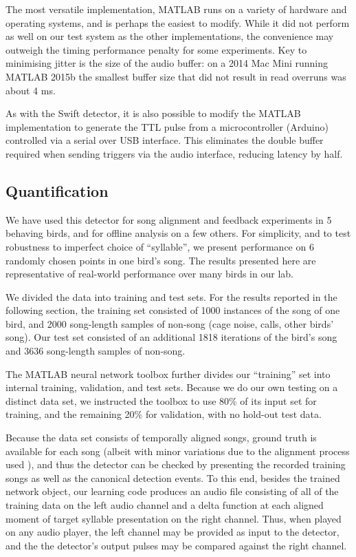 \documentclass[10pt,letterpaper]{article}
\begin{document}
The most versatile implementation, MATLAB runs on a variety of
hardware and operating systems, and is perhaps the easiest to modify.
While it did not perform as well on our test system as the other
implementations, the convenience may outweigh the timing
performance penalty for some experiments.  Key to minimising jitter is
the size of the audio buffer: on a 2014 Mac Mini running MATLAB 2015b
the smallest buffer size that did not result in read overruns was
about 4 ms.

As with the Swift detector, it is also possible to modify the
MATLAB implementation to generate the TTL pulse from a microcontroller
(Arduino) controlled via a serial over USB interface. This eliminates
the double buffer required when sending triggers via the audio
interface, reducing latency by half.

\subsection{Quantification}
\label{sec:quantify}

We have used this detector for song alignment and feedback experiments
in 5 behaving birds, and for offline analysis on a few others.  For
simplicity, and to test robustness to imperfect choice of ``syllable'', we present performance on 6 randomly chosen points in one
bird's song.  The results presented here are representative of
real-world performance over many birds in our lab.

We divided the data into training and test sets.  For the results
reported in the following section, the training set consisted of 1000
instances of the song of one bird, and 2000 song-length samples of
non-song (cage noise, calls, other birds' song).  Our test set
consisted of an additional 1818 iterations of the bird's song and 3636
song-length samples of non-song.

The MATLAB neural network toolbox further divides our ``training'' set
into internal training, validation, and test sets.  Because we do our
own testing on a distinct data set, we instructed the
toolbox to use 80\% of its input set for training, and the
remaining 20\% for validation, with no hold-out test data.

Because the data set consists of temporally aligned songs, ground
truth is available for each song (albeit with minor variations due to
the alignment process used \cite{Poole2012}), and thus the detector
can be checked by presenting the recorded training songs as well as
the canonical detection events. To this end, besides the trained
network object, our learning code produces an audio file consisting of
all of the training data on the left audio channel and a delta
function at each aligned moment of target syllable presentation on the
right channel. Thus, when played on any audio player, the left channel
may be provided as input to the detector, and the the detector's
output pulses may be compared against the right channel.
\end{document}

